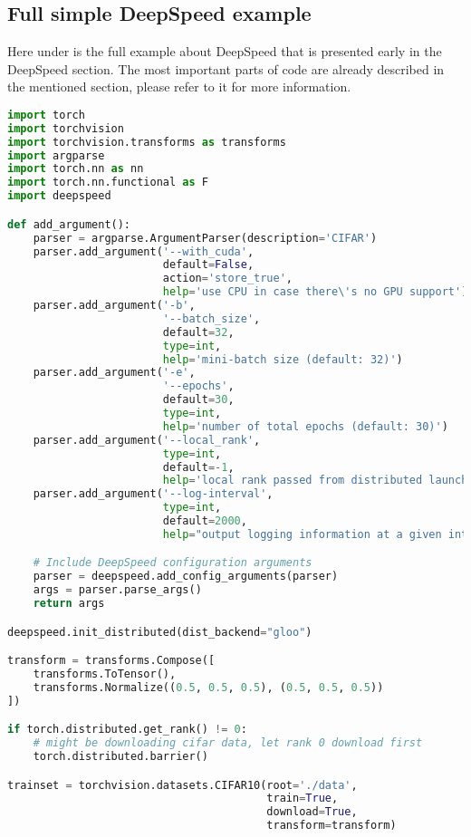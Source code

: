 \subsection{Full simple DeepSpeed example}
Here under is the full example about DeepSpeed that is presented early in the DeepSpeed section. The most important parts of code are already described in the mentioned section, please refer to it for more information.
\begin{lstlisting}[language=Python]
import torch
import torchvision
import torchvision.transforms as transforms
import argparse
import torch.nn as nn
import torch.nn.functional as F
import deepspeed

def add_argument():
    parser = argparse.ArgumentParser(description='CIFAR')
    parser.add_argument('--with_cuda',
                        default=False,
                        action='store_true',
                        help='use CPU in case there\'s no GPU support')
    parser.add_argument('-b',
                        '--batch_size',
                        default=32,
                        type=int,
                        help='mini-batch size (default: 32)')
    parser.add_argument('-e',
                        '--epochs',
                        default=30,
                        type=int,
                        help='number of total epochs (default: 30)')
    parser.add_argument('--local_rank',
                        type=int,
                        default=-1,
                        help='local rank passed from distributed launcher')
    parser.add_argument('--log-interval',
                        type=int,
                        default=2000,
                        help="output logging information at a given interval")

    # Include DeepSpeed configuration arguments
    parser = deepspeed.add_config_arguments(parser)
    args = parser.parse_args()
    return args

deepspeed.init_distributed(dist_backend="gloo")

transform = transforms.Compose([
    transforms.ToTensor(),
    transforms.Normalize((0.5, 0.5, 0.5), (0.5, 0.5, 0.5))
])

if torch.distributed.get_rank() != 0:
    # might be downloading cifar data, let rank 0 download first
    torch.distributed.barrier()

trainset = torchvision.datasets.CIFAR10(root='./data',
                                        train=True,
                                        download=True,
                                        transform=transform)


\end{lstlisting}
